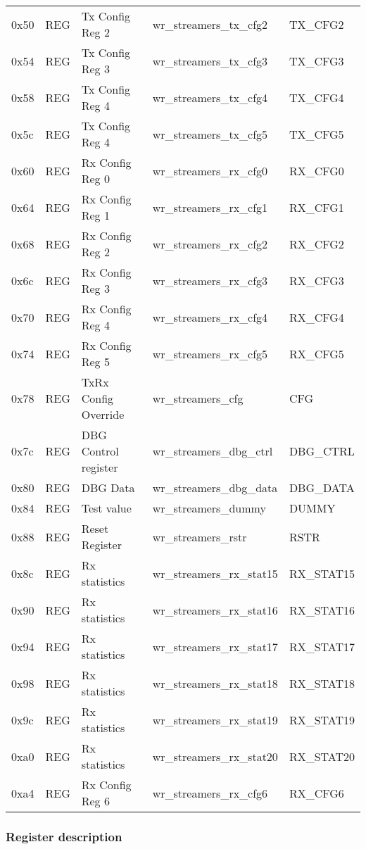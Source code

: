 {\begin{tabular}{|l|l|l|l|l|}
0x50& REG & Tx Config Reg 2 & wr\_streamers\_tx\_cfg2 & TX\_CFG2\\
0x54& REG & Tx Config Reg 3 & wr\_streamers\_tx\_cfg3 & TX\_CFG3\\
0x58& REG & Tx Config Reg 4 & wr\_streamers\_tx\_cfg4 & TX\_CFG4\\
0x5c& REG & Tx Config Reg 4 & wr\_streamers\_tx\_cfg5 & TX\_CFG5\\
0x60& REG & Rx Config Reg 0 & wr\_streamers\_rx\_cfg0 & RX\_CFG0\\
0x64& REG & Rx Config Reg 1 & wr\_streamers\_rx\_cfg1 & RX\_CFG1\\
0x68& REG & Rx Config Reg 2 & wr\_streamers\_rx\_cfg2 & RX\_CFG2\\
0x6c& REG & Rx Config Reg 3 & wr\_streamers\_rx\_cfg3 & RX\_CFG3\\
0x70& REG & Rx Config Reg 4 & wr\_streamers\_rx\_cfg4 & RX\_CFG4\\
0x74& REG & Rx Config Reg 5 & wr\_streamers\_rx\_cfg5 & RX\_CFG5\\
0x78& REG & TxRx Config Override & wr\_streamers\_cfg & CFG\\
0x7c& REG & DBG Control register & wr\_streamers\_dbg\_ctrl & DBG\_CTRL\\
0x80& REG & DBG Data & wr\_streamers\_dbg\_data & DBG\_DATA\\
0x84& REG & Test value & wr\_streamers\_dummy & DUMMY\\
0x88& REG & Reset Register & wr\_streamers\_rstr & RSTR\\
0x8c& REG & Rx statistics & wr\_streamers\_rx\_stat15 & RX\_STAT15\\
0x90& REG & Rx statistics & wr\_streamers\_rx\_stat16 & RX\_STAT16\\
0x94& REG & Rx statistics & wr\_streamers\_rx\_stat17 & RX\_STAT17\\
0x98& REG & Rx statistics & wr\_streamers\_rx\_stat18 & RX\_STAT18\\
0x9c& REG & Rx statistics & wr\_streamers\_rx\_stat19 & RX\_STAT19\\
0xa0& REG & Rx statistics & wr\_streamers\_rx\_stat20 & RX\_STAT20\\
0xa4& REG & Rx Config Reg 6 & wr\_streamers\_rx\_cfg6 & RX\_CFG6\\
\hline
\end{tabular}
}

\subsubsection{Register description}
